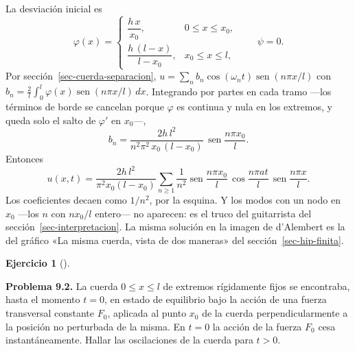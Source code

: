 \documentclass[
  spanish,
  a4paper,
]{scrbook}
\theoremstyle{definition}
\theoremstyle{plain}
\theoremstyle{definition}
\theoremstyle{plain}
\theoremstyle{definition}
\newtheorem{exercise}{Ejercicio}[chapter]
\theoremstyle{remark}
\begin{document}
\begin{tcolorbox}[enhanced jigsaw, arc=.35mm, bottomrule=.15mm, bottomtitle=1mm, breakable, colback=white, colbacktitle=quarto-callout-tip-color!10!white, colframe=quarto-callout-tip-color-frame, coltitle=black, left=2mm, leftrule=.75mm, opacityback=0, opacitybacktitle=0.6, rightrule=.15mm, title=\textcolor{quarto-callout-tip-color}{\faLightbulb}\hspace{0.5em}{Solución}, titlerule=0mm, toprule=.15mm, toptitle=1mm]

La desviación inicial es \[
\varphi(x) = \begin{cases} \dfrac{h\,x}{x_0}, & 0\le x\le x_0,\\[2mm] \dfrac{h\,(l-x)}{l-x_0}, & x_0\le x\le l,\end{cases}
\qquad \psi = 0 .
\] Por sección~\ref{sec-cuerda-separacion},
\(u = \sum_n b_n\cos(\omega_nt)\operatorname{sen}(n\pi x/l)\) con
\(b_n = \tfrac2l\int_0^l\varphi(x)\operatorname{sen}(n\pi x/l)\,dx\).
Integrando por partes en cada tramo ---los términos de borde se cancelan
porque \(\varphi\) es continua y nula en los extremos, y queda solo el
salto de \(\varphi'\) en \(x_0\)---, \[
b_n = \frac{2h\,l^2}{n^2\pi^2\,x_0\,(l-x_0)}\,\operatorname{sen}\frac{n\pi x_0}{l} .
\] Entonces \[
u(x,t) = \frac{2h\,l^2}{\pi^2x_0(l-x_0)}\sum_{n\ge1}\frac{1}{n^2}\operatorname{sen}\frac{n\pi x_0}{l}\,\cos\frac{n\pi at}{l}\,\operatorname{sen}\frac{n\pi x}{l}.
\] Los coeficientes decaen como \(1/n^2\), por la esquina. Y los modos
con un nodo en \(x_0\) ---los \(n\) con \(nx_0/l\) entero--- no
aparecen: es el truco del guitarrista del
sección~\ref{sec-interpretacion}. La misma solución en la imagen de
d'Alembert es la del gráfico «La misma cuerda, vista de dos maneras» del
sección~\ref{sec-hip-finita}.

\end{tcolorbox}

\begin{exercise}[]\protect\hypertarget{exr-hip-p2}{}\label{exr-hip-p2}

\textbf{Problema 9.2.} La cuerda \(0\le x\le l\) de extremos rígidamente
fijos se encontraba, hasta el momento \(t = 0\), en estado de equilibrio
bajo la acción de una fuerza transversal constante \(F_0\), aplicada al
punto \(x_0\) de la cuerda perpendicularmente a la posición no
perturbada de la misma. En \(t = 0\) la acción de la fuerza \(F_0\) cesa
instantáneamente. Hallar las oscilaciones de la cuerda para \(t>0\).

\end{exercise}
\end{document}
